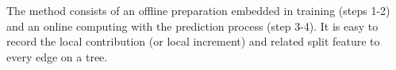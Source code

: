 The method consists of an offline preparation embedded in training (steps 1-2) 
and an online computing with the prediction process (step 3-4). 
It is easy to record the local contribution (or local increment) and related split feature to every edge on a tree. 
%
